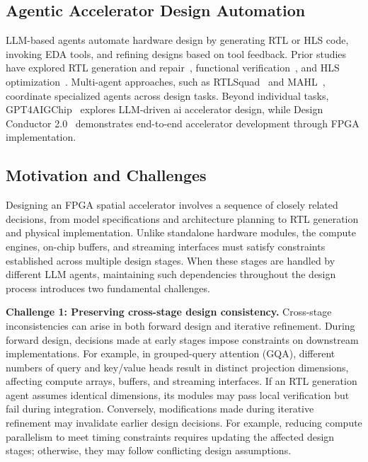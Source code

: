 \documentclass[conference]{IEEEtran}
\begin{document}
\subsection{Agentic Accelerator Design Automation}
LLM-based agents automate hardware design by generating RTL or HLS code, invoking EDA tools, and refining designs based on tool feedback. Prior studies have explored RTL generation and repair~\cite{mage,rtlfixer}, functional verification~\cite{assertllm,correctbench}, and HLS optimization~\cite{hlspilot}. Multi-agent approaches, such as RTLSquad~\cite{rtlsquad} and MAHL~\cite{mahl}, coordinate specialized agents across design tasks. Beyond individual tasks, GPT4AIGChip~\cite{gpt4aigchip} explores LLM-driven ai accelerator design, while Design Conductor 2.0~\cite{designconductor2} demonstrates end-to-end accelerator development through FPGA implementation.

\subsection{Motivation and Challenges}
Designing an FPGA spatial accelerator involves a sequence of closely related decisions, from model specifications and architecture planning to RTL generation and physical implementation. Unlike standalone hardware modules, the compute engines, on-chip buffers, and streaming interfaces must satisfy constraints established across multiple design stages. When these stages are handled by different LLM agents, maintaining such dependencies throughout the design process introduces two fundamental challenges.

\noindent\textbf{Challenge 1: Preserving cross-stage design consistency.}
Cross-stage inconsistencies can arise in both forward design and iterative refinement. During forward design, decisions made at early stages impose constraints on downstream implementations. For example, in grouped-query attention (GQA), different numbers of query and key/value heads result in distinct projection dimensions, affecting compute arrays, buffers, and streaming interfaces. If an RTL generation agent assumes identical dimensions, its modules may pass local verification but fail during integration. Conversely, modifications made during iterative refinement may invalidate earlier design decisions. For example, reducing compute parallelism to meet timing constraints requires updating the affected design stages; otherwise, they may follow conflicting design assumptions.
\end{document}
